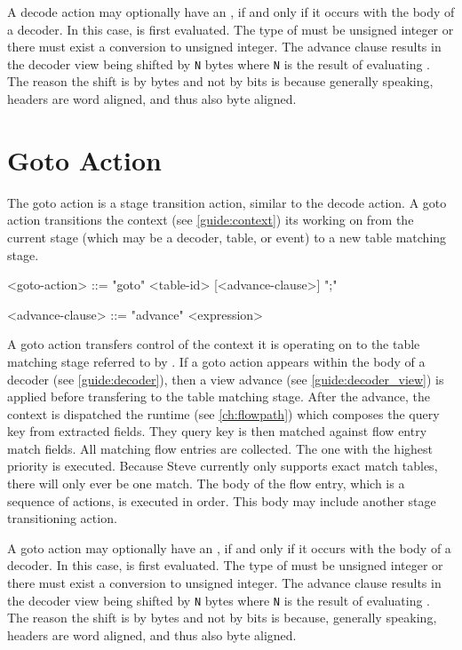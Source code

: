 A decode action may optionally have an , if and only if it occurs with the body of a decoder. In this case,  is first evaluated. The type of  must be unsigned integer or there must exist a conversion to unsigned integer. The advance clause results in the decoder view being shifted by \texttt{N} bytes where \texttt{N} is the result of evaluating . The reason the shift is by bytes and not by bits is because generally speaking, headers are word aligned, and thus also byte aligned.

\section{Goto Action} \label{guide:goto}

The goto action is a stage transition action, similar to the decode action. A goto action transitions the context (see \ref{guide:context}) its working on from the current stage (which may be a decoder, table, or event) to a new table matching stage.

\begin{minip}
\begin{grammar}
<goto-action> ::=
"goto" <table-id> [<advance-clause>] ";"

<advance-clause> ::= "advance" <expression>
\end{grammar}
\end{minip}

A goto action transfers control of the context it is operating on to the table matching stage referred to by . If a goto action appears within the body of a decoder (see \ref{guide:decoder}), then a view advance (see \ref{guide:decoder_view}) is applied before transfering to the table matching stage. After the advance, the context is dispatched the runtime (see \ref{ch:flowpath}) which composes the query key from extracted fields. They query key is then matched against flow entry match fields. All matching flow entries are collected. The one with the highest priority is executed. Because Steve currently only supports exact match tables, there will only ever be one match. The body of the flow entry, which is a sequence of actions, is executed in order. This body may include another stage transitioning action.

A goto action may optionally have an , if and only if it occurs with the body of a decoder. In this case,  is first evaluated. The type of  must be unsigned integer or there must exist a conversion to unsigned integer. The advance clause results in the decoder view being shifted by \texttt{N} bytes where \texttt{N} is the result of evaluating . The reason the shift is by bytes and not by bits is because, generally speaking, headers are word aligned, and thus also byte aligned.


